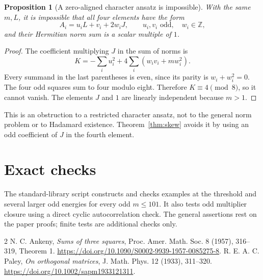\documentclass[11pt]{article}
\newtheorem{proposition}[theorem]{Proposition}
\newcommand{\Z}{\mathbb Z}
\begin{document}
\begin{proposition}[A zero-aligned character ansatz is impossible]
With the same $m,L$, it is impossible that all four elements have the
form
\[
 A_i=u_iL+v_i+2w_iJ,\qquad u_i,v_i\text{ odd},\quad w_i\in\Z,
\]
and their Hermitian norm sum is a scalar multiple of $1$.
\end{proposition}
\begin{proof}
The coefficient multiplying $J$ in the sum of norms is
\[
 K=-\sum_i u_i^2+4\sum_i(w_iv_i+mw_i^2).
\]
Every summand in the last parentheses is even, since its parity is
$w_i+w_i^2=0$. The four odd squares sum to four modulo eight.
Therefore $K\equiv4\pmod8$, so it cannot vanish. The elements $J$ and
$1$ are linearly independent because $m>1$.
\end{proof}
This is an obstruction to a restricted character ansatz, not to the
general norm problem or to Hadamard existence. Theorem~\ref{thm:skew}
avoids it by using an odd coefficient of $J$ in the fourth element.

\section*{Exact checks}
The standard-library script  constructs and
checks examples at the threshold and several larger odd energies for
every odd $m\le101$. It also tests odd multiplier closure using a direct
cyclic autocorrelation check. The general assertions rest on the paper
proofs; finite tests are additional checks only.

\begin{thebibliography}{2}
 N. C. Ankeny, \emph{Sums of three squares},
Proc. Amer. Math. Soc. 8 (1957), 316--319, Theorem 1.
\url{https://doi.org/10.1090/S0002-9939-1957-0085275-8}.
 R. E. A. C. Paley, \emph{On orthogonal matrices},
J. Math. Phys. 12 (1933), 311--320.
\url{https://doi.org/10.1002/sapm1933121311}.
\end{thebibliography}
\end{document}
